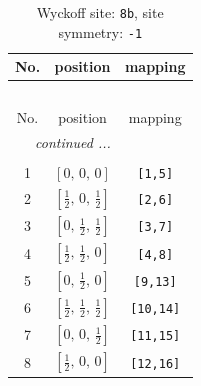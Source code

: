 \documentclass[fleqn,8pt]{jsarticle}
\begin{document}
\begin{longtable}{ccc}
\caption{Wyckoff site: {\tt 8b}, site symmetry: {\tt -1}}
 \\
 \hline \hline
No. & position & mapping \\ \hline \endfirsthead

\multicolumn{2}{l}{\tablename\ \thetable{}} \\
 \hline \hline
No. & position & mapping \\ \hline \endhead

 \hline \hline
\multicolumn{2}{r}{\footnotesize\it continued ...} \\ \endfoot

 \hline \hline
\multicolumn{2}{r}{} \\ \endlastfoot

1 & $\left[ 0,\, 0,\, 0 \right]$ & {\tt [1,5]} \\ \hline
2 & $\left[ \frac{1}{2},\, 0,\, \frac{1}{2} \right]$ & {\tt [2,6]} \\ \hline
3 & $\left[ 0,\, \frac{1}{2},\, \frac{1}{2} \right]$ & {\tt [3,7]} \\ \hline
4 & $\left[ \frac{1}{2},\, \frac{1}{2},\, 0 \right]$ & {\tt [4,8]} \\ \hline
5 & $\left[ 0,\, \frac{1}{2},\, 0 \right]$ & {\tt [9,13]} \\ \hline
6 & $\left[ \frac{1}{2},\, \frac{1}{2},\, \frac{1}{2} \right]$ & {\tt [10,14]} \\ \hline
7 & $\left[ 0,\, 0,\, \frac{1}{2} \right]$ & {\tt [11,15]} \\ \hline
8 & $\left[ \frac{1}{2},\, 0,\, 0 \right]$ & {\tt [12,16]} \\
\end{longtable}
\renewcommand{\arraystretch}{1.2}
\end{document}
